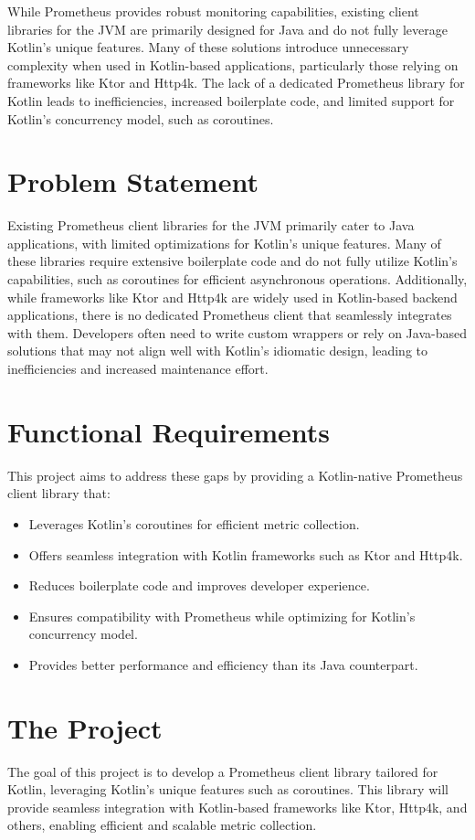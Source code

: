 \documentclass[a4paper,twoside,11pt]{article}
\begin{document}
While Prometheus provides robust monitoring capabilities, existing client libraries for the JVM are primarily designed for Java and do not fully leverage Kotlin’s unique features. Many of these solutions introduce unnecessary complexity when used in Kotlin-based applications, particularly those relying on frameworks like Ktor and Http4k.
The lack of a dedicated Prometheus library for Kotlin leads to inefficiencies, increased boilerplate code, and limited support for Kotlin's concurrency model, such as coroutines. 

\section{Problem Statement}
Existing Prometheus client libraries for the JVM primarily cater to Java applications, with limited optimizations for Kotlin’s unique features. Many of these libraries require extensive boilerplate code and do not fully utilize Kotlin’s capabilities, such as coroutines for efficient asynchronous operations.
Additionally, while frameworks like Ktor and Http4k are widely used in Kotlin-based backend applications, there is no dedicated Prometheus client that seamlessly integrates with them. Developers often need to write custom wrappers or rely on Java-based solutions that may not align well with Kotlin’s idiomatic design, leading to inefficiencies and increased maintenance effort.

\section{Functional Requirements}
This project aims to address these gaps by providing a Kotlin-native Prometheus client library that:
\begin{itemize}
    \item Leverages Kotlin’s coroutines for efficient metric collection.
    \item Offers seamless integration with Kotlin frameworks such as Ktor and Http4k.
    \item Reduces boilerplate code and improves developer experience.
    \item Ensures compatibility with Prometheus while optimizing for Kotlin’s concurrency model.
    \item Provides better performance and efficiency than its Java counterpart.
\end{itemize}

\section{The Project}
The goal of this project is to develop a Prometheus client library tailored for Kotlin, leveraging Kotlin's unique features such as coroutines. This library will provide seamless integration with Kotlin-based frameworks like Ktor, Http4k, and others, enabling efficient and scalable metric collection.
\end{document}
